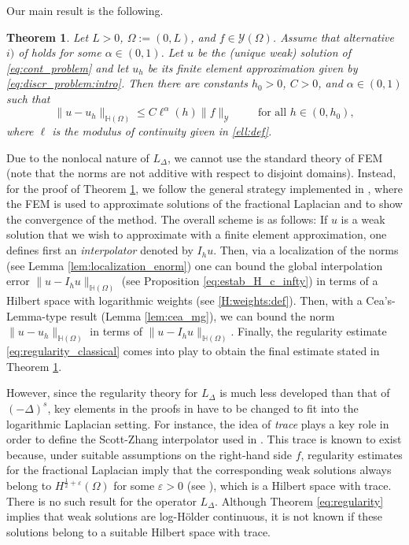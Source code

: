 \documentclass[11 pt]{article}
\newtheorem{theorem}{Theorem}[section]
\numberwithin{equation}{section}
\def\eps{\varepsilon}
\begin{document}
 Our main result is the following.
 \begin{theorem}\label{main:thm:intro}
    Let $L>0$, $\Omega:=(0,L)$, and $f\in \mathcal{Y}(\Omega)$.  Assume that alternative $i)$ of  holds for some $\alpha\in(0,1)$. Let $u$ be the (unique weak) solution of \eqref{eq:cont_problem} and let $u_h$ be its finite element approximation given by \eqref{eq:discr_problem:intro}. Then there are constants $h_0>0$, $C>0$, and $\alpha\in(0,1)$ such that
    \begin{equation*}
        \|u-u_h\|_{\mathbb H(\Omega)}\leq C\ell^{\alpha}(h)\|f\|_{\mathcal Y}\qquad \text{ for all }h\in(0,h_0),
    \end{equation*}
    where $\ell$ is the modulus of continuity given in \eqref{ell:def}.
 \end{theorem}
 Due to the nonlocal nature of $L_\Delta$, we cannot use the standard theory of FEM (note that the norms are not additive with respect to disjoint domains). Instead, for the proof of Theorem \ref{main:thm:intro}, we follow the general strategy implemented in \cite{Bor17}, where the FEM is used to approximate solutions of the fractional Laplacian and to show the convergence of the method.  The overall scheme is as follows: If $u$ is a weak solution that we wish to approximate with a finite element approximation, one defines first an \emph{interpolator} denoted by $I_h u$.  Then, via a localization of the norms (see Lemma \ref{lem:localization_enorm}) one can bound the global interpolation error $\|u-I_h u\|_{\mathbb H(\Omega)}$ (see Proposition \ref{eq:estab_H_c_infty}) in terms of a Hilbert space with logarithmic weights (see \eqref{H:weights:def}).  Then, with a Cea's-Lemma-type result (Lemma \ref{lem:cea_mg}), we can bound the norm $\|u-u_h\|_{\mathbb H(\Omega)}$ in terms of $\|u-I_h u\|_{\mathbb H(\Omega)}$.  Finally, the regularity estimate \eqref{eq:regularity_classical} comes into play to obtain the final estimate stated in Theorem \ref{main:thm:intro}.

 However, since the regularity theory for $L_\Delta$ is much less developed than that of $(-\Delta)^s$, key elements in the proofs in \cite{Bor17} have to be changed to fit into the logarithmic Laplacian setting.  For instance, the idea of \emph{trace} plays a key role in order to define the Scott-Zhang interpolator used in \cite{Bor17}. This trace is known to exist because, under suitable assumptions on the right-hand side $f$, regularity estimates for the fractional Laplacian imply that the corresponding weak solutions always belong to $H^{\frac{1}{2}+\eps}(\Omega)$ for some $\eps>0$ (see \cite[Theorem 2.3.6]{Bor17}), which is a Hilbert space with trace.  There is no such result for the operator $L_\Delta$.  Although Theorem \ref{eq:regularity} implies that weak solutions are log-Hölder continuous, it is not known if these solutions belong to a suitable Hilbert space with trace.
\end{document}
